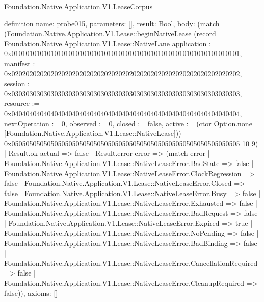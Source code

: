 \begin{lexlean}{Foundation.Native.Application.V1.LeaseCorpus}
\begin{semanticmodule}
definition{
  name: probe015,
  parameters: [],
  result: Bool,
  body: (match (Foundation.Native.Application.V1.Lease::beginNativeLease (record Foundation.Native.Application.V1.Lease::NativeLane {application := 0x0101010101010101010101010101010101010101010101010101010101010101, manifest := 0x0202020202020202020202020202020202020202020202020202020202020202, session := 0x0303030303030303030303030303030303030303030303030303030303030303, resource := 0x0404040404040404040404040404040404040404040404040404040404040404, nextOperation := 0, observed := 0, closed := false, active := (ctor Option.none [Foundation.Native.Application.V1.Lease::NativeLease])}) 0x0505050505050505050505050505050505050505050505050505050505050505 10 9)
    | Result.ok actual => false
    | Result.error error => (match error
      | Foundation.Native.Application.V1.Lease::NativeLeaseError.BadState => false
      | Foundation.Native.Application.V1.Lease::NativeLeaseError.ClockRegression => false
      | Foundation.Native.Application.V1.Lease::NativeLeaseError.Closed => false
      | Foundation.Native.Application.V1.Lease::NativeLeaseError.Busy => false
      | Foundation.Native.Application.V1.Lease::NativeLeaseError.Exhausted => false
      | Foundation.Native.Application.V1.Lease::NativeLeaseError.BadRequest => false
      | Foundation.Native.Application.V1.Lease::NativeLeaseError.Expired => true
      | Foundation.Native.Application.V1.Lease::NativeLeaseError.NoPending => false
      | Foundation.Native.Application.V1.Lease::NativeLeaseError.BadBinding => false
      | Foundation.Native.Application.V1.Lease::NativeLeaseError.CancellationRequired => false
      | Foundation.Native.Application.V1.Lease::NativeLeaseError.CleanupRequired => false)),
  axioms: []
}


\end{semanticmodule}
\end{lexlean}
